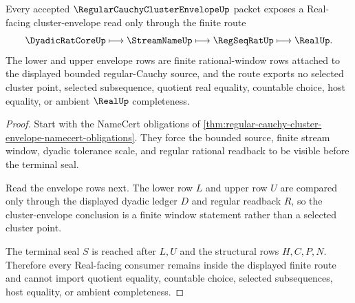 \begin{theorem}
\label{thm:regular-cauchy-cluster-envelope-real-seal-route}
Every accepted $\RegularCauchyClusterEnvelopeUp$ packet exposes a Real-facing cluster-envelope read only through the finite route
$$
\DyadicRatCoreUp \longmapsto \StreamNameUp \longmapsto \RegSeqRatUp \longmapsto \RealUp .
$$
The lower and upper envelope rows are finite rational-window rows attached to the displayed bounded regular-Cauchy source, and the route exports no selected cluster point, selected subsequence, quotient real equality, countable choice, host equality, or ambient $\RealUp$ completeness.
\end{theorem}
\begin{proof}
Start with the NameCert obligations of \autoref{thm:regular-cauchy-cluster-envelope-namecert-obligations}. They force the bounded source, finite stream window, dyadic tolerance scale, and regular rational readback to be visible before the terminal seal.

Read the envelope rows next. The lower row $L$ and upper row $U$ are compared only through the displayed dyadic ledger $D$ and regular readback $R$, so the cluster-envelope conclusion is a finite window statement rather than a selected cluster point.

The terminal seal $S$ is reached after $L,U$ and the structural rows $H,C,P,N$. Therefore every Real-facing consumer remains inside the displayed finite route and cannot import quotient equality, countable choice, selected subsequences, host equality, or ambient completeness.
\end{proof}




